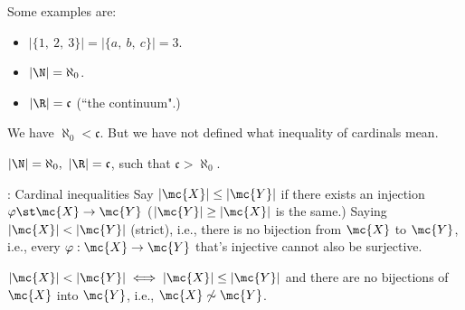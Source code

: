 \begin{example}
	Some examples are:
	\begin{itemize}
		\item \(|\{1,~2,~3\}|=|\{a,~b,~c\}|=3\).
		
		\item \(|\N|=\aleph_0\).
		
		\item \(|\R|=\mathfrak{c}\) (``the continuum".)
	\end{itemize}
\end{example}
We have \(\aleph_0<\mathfrak{c}\). But we have not defined what inequality of cardinals mean.
\begin{example}
	\(|\N|=\aleph_0,~|\R|=\mathfrak{c}\), such that \(\mathfrak{c}>\aleph_0\).
\end{example}

\begin{ndef}{: Cardinal inequalities}
	Say \(|\mc{X}|\leq |\mc{Y}|\) if there exists an injection \(\varphi\st\mc{X}\to\mc{Y}\) (\(|\mc{Y}|\geq |\mc{X}|\) is the same.) Saying \(|\mc{X}|<|\mc{Y}|\) (strict), i.e., there is no bijection from \(\mc{X}\) to \(\mc{Y}\), i.e., every \(\varphi:\mc{X}\to\mc{Y}\) that's injective cannot also be surjective.
	
	\medskip
	
	\(|\mc{X}|<|\mc{Y}|\iff |\mc{X}|\leq |\mc{Y}|\) and there are no bijections of \(\mc{X}\) into \(\mc{Y}\), i.e., \(\mc{X}\not\sim \mc{Y}\).
\end{ndef}

